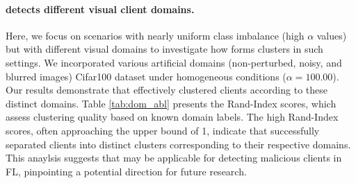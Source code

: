 \paragraph{\shortname detects different visual client domains.}
Here, we focus on scenarios with nearly uniform class imbalance (high $\alpha$ values) but with different visual domains to investigate how \shortname forms clusters in such settings. We incorporated various artificial domains (non-perturbed, noisy, and blurred images) Cifar100 dataset under homogeneous conditions ($\alpha=100.00$). Our results demonstrate that \shortname effectively clustered clients according to these distinct domains. Table \ref{tab:dom_abl} presents the Rand-Index scores, which assess clustering quality based on known domain labels. The high Rand-Index scores, often approaching the upper bound of 1, indicate that \shortname successfully separated clients into distinct clusters corresponding to their respective domains. %
This anaylsis suggests that \shortname may be applicable for detecting malicious clients in FL, pinpointing a potential direction for future research.
